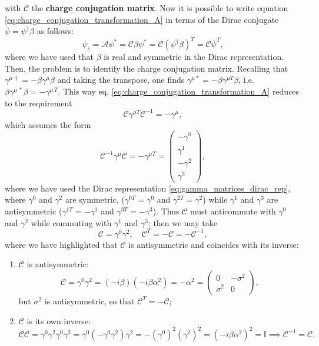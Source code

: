 with \(\mathcal{C}\) the \textbf{charge conjugation matrix}. Now it is possible to write equation \eqref{eq:charge_conjugation_transformation_A} in terms of the Dirac conjugate \(\overline{\psi} = \psi^{\dagger} \beta\) as follows:
\begin{equation}
    \psi_c = \mathcal{A} \psi^* = \mathcal{C} \beta \psi^*= \mathcal{C} (\psi^\dagger \beta)^T = \mathcal{C} \overline{\psi}^T,
\end{equation}
where we have used that \(\beta\) is real and symmetric in the Dirac representation. Then, the problem is to identify the charge conjugation matrix. Recalling that \(\gamma^{\mu\,\dagger} = -\beta \gamma^\mu \beta\) and taking the transpose, one finds \(\gamma^{\mu *} = -\beta \gamma^{\mu T} \beta\), i.e. \(\beta \gamma^{\mu\,*} \beta = - \gamma^{\mu\,T}\). This way eq. \eqref{eq:charge_conjugation_transformation_A} reduces to the requirement
\begin{equation}
    \mathcal{C} \gamma^{\mu T} \mathcal{C}^{-1} = - \gamma^{\mu},
    \label{eq:charge_conjugation_gamma_condition_C}
\end{equation}
which assumes the form
\[
    \mathcal{C}^{-1} \gamma^{\mu} \mathcal{C} = - \gamma^{\mu T} = \begin{pmatrix}
        -\gamma^{0} \\
        \gamma^{1}  \\
        -\gamma^{2} \\
        \gamma^{3}
    \end{pmatrix},
\]
where we have used the Dirac representation \eqref{eq:gamma_matrices_dirac_rep}, where \(\gamma^0\) and \(\gamma^2\) are symmetric, (\(\gamma^{0 T} = \gamma^0\)
and \(\gamma^{2 T} = \gamma^2\)) while \(\gamma^1\) and \(\gamma^3\) are antisymmetric (\(\gamma^{1 T} = -\gamma^1\) and \(\gamma^{3 T} = -\gamma^3\)). Thus \(\mathcal{C}\) must anticommute with \(\gamma^0\) and \(\gamma^2\) while commuting with \(\gamma^1\) and \(\gamma^3\); then we may take
\begin{equation}
    \mathcal{C} = \gamma^0\gamma^2, \quad \mathcal{C}^T = -\mathcal{C} = - \mathcal{C}^{-1},
    \label{eq:charge_conjugation_matrix_C}
\end{equation}
where we have highlighted that \(\mathcal{C}\) is antisymmetric and coincides with its inverse:
\begin{enumerate}
    \item \(\mathcal{C}\) is antisymmetric:
          \[
              \mathcal{C} = \gamma^0 \gamma^2 = (-i \beta)(-i \beta \alpha^2) = -\alpha^2 = \begin{pmatrix}
                  0        & -\sigma^2 \\
                  \sigma^2 & 0
              \end{pmatrix},
          \]
          but \(\sigma^2\) is antisymmetric, so that \(\mathcal{C}^T = -\mathcal{C}\);
    \item \(\mathcal{C}\) is its own inverse:
          \[
              \mathcal{C} \mathcal{C} = \gamma^0 \gamma^2 \gamma^0 \gamma^2 = \gamma^0 (-\gamma^0 \gamma^2) \gamma^2 = - (\gamma^0)^2 (\gamma^2)^2 = (-i \beta \alpha^2)^2 = \mathbb{I} \implies \mathcal{C}^{-1} = \mathcal{C}.
          \]
\end{enumerate}

